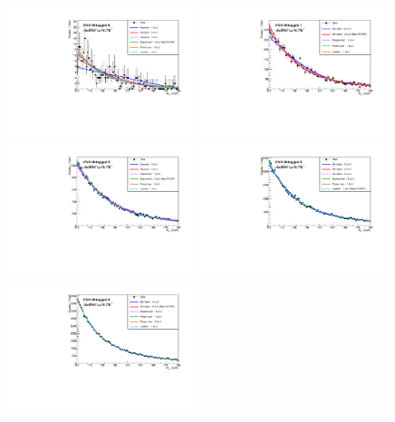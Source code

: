 \begin{figure}
  \includegraphics[width=0.49\textwidth]{analysis/plots/multipdf_plots/cat0_8TeV.pdf}
  \includegraphics[width=0.49\textwidth]{analysis/plots/multipdf_plots/cat1_8TeV.pdf}\\
  \includegraphics[width=0.49\textwidth]{analysis/plots/multipdf_plots/cat2_8TeV.pdf}
  \includegraphics[width=0.49\textwidth]{analysis/plots/multipdf_plots/cat3_8TeV.pdf}\\
  \includegraphics[width=0.49\textwidth]{analysis/plots/multipdf_plots/cat4_8TeV.pdf}

\end{figure}
